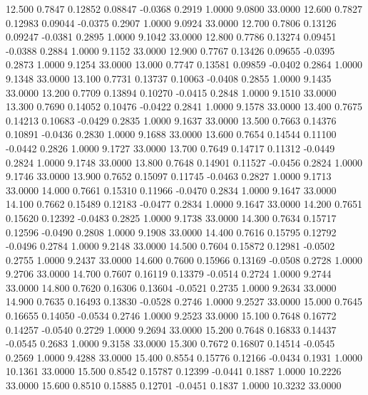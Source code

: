   12.500   0.7847   0.12852   0.08847  -0.0368   0.2919   1.0000   9.0800  33.0000
  12.600   0.7827   0.12983   0.09044  -0.0375   0.2907   1.0000   9.0924  33.0000
  12.700   0.7806   0.13126   0.09247  -0.0381   0.2895   1.0000   9.1042  33.0000
  12.800   0.7786   0.13274   0.09451  -0.0388   0.2884   1.0000   9.1152  33.0000
  12.900   0.7767   0.13426   0.09655  -0.0395   0.2873   1.0000   9.1254  33.0000
  13.000   0.7747   0.13581   0.09859  -0.0402   0.2864   1.0000   9.1348  33.0000
  13.100   0.7731   0.13737   0.10063  -0.0408   0.2855   1.0000   9.1435  33.0000
  13.200   0.7709   0.13894   0.10270  -0.0415   0.2848   1.0000   9.1510  33.0000
  13.300   0.7690   0.14052   0.10476  -0.0422   0.2841   1.0000   9.1578  33.0000
  13.400   0.7675   0.14213   0.10683  -0.0429   0.2835   1.0000   9.1637  33.0000
  13.500   0.7663   0.14376   0.10891  -0.0436   0.2830   1.0000   9.1688  33.0000
  13.600   0.7654   0.14544   0.11100  -0.0442   0.2826   1.0000   9.1727  33.0000
  13.700   0.7649   0.14717   0.11312  -0.0449   0.2824   1.0000   9.1748  33.0000
  13.800   0.7648   0.14901   0.11527  -0.0456   0.2824   1.0000   9.1746  33.0000
  13.900   0.7652   0.15097   0.11745  -0.0463   0.2827   1.0000   9.1713  33.0000
  14.000   0.7661   0.15310   0.11966  -0.0470   0.2834   1.0000   9.1647  33.0000
  14.100   0.7662   0.15489   0.12183  -0.0477   0.2834   1.0000   9.1647  33.0000
  14.200   0.7651   0.15620   0.12392  -0.0483   0.2825   1.0000   9.1738  33.0000
  14.300   0.7634   0.15717   0.12596  -0.0490   0.2808   1.0000   9.1908  33.0000
  14.400   0.7616   0.15795   0.12792  -0.0496   0.2784   1.0000   9.2148  33.0000
  14.500   0.7604   0.15872   0.12981  -0.0502   0.2755   1.0000   9.2437  33.0000
  14.600   0.7600   0.15966   0.13169  -0.0508   0.2728   1.0000   9.2706  33.0000
  14.700   0.7607   0.16119   0.13379  -0.0514   0.2724   1.0000   9.2744  33.0000
  14.800   0.7620   0.16306   0.13604  -0.0521   0.2735   1.0000   9.2634  33.0000
  14.900   0.7635   0.16493   0.13830  -0.0528   0.2746   1.0000   9.2527  33.0000
  15.000   0.7645   0.16655   0.14050  -0.0534   0.2746   1.0000   9.2523  33.0000
  15.100   0.7648   0.16772   0.14257  -0.0540   0.2729   1.0000   9.2694  33.0000
  15.200   0.7648   0.16833   0.14437  -0.0545   0.2683   1.0000   9.3158  33.0000
  15.300   0.7672   0.16807   0.14514  -0.0545   0.2569   1.0000   9.4288  33.0000
  15.400   0.8554   0.15776   0.12166  -0.0434   0.1931   1.0000  10.1361  33.0000
  15.500   0.8542   0.15787   0.12399  -0.0441   0.1887   1.0000  10.2226  33.0000
  15.600   0.8510   0.15885   0.12701  -0.0451   0.1837   1.0000  10.3232  33.0000
